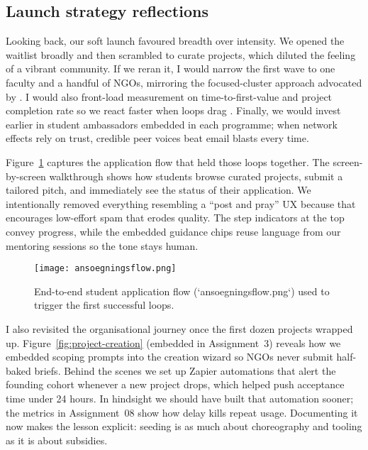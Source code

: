\subsection*{Launch strategy reflections}
Looking back, our soft launch favoured breadth over intensity. We opened the waitlist broadly and then scrambled to curate projects, which diluted the feeling of a vibrant community. If we reran it, I would narrow the first wave to one faculty and a handful of NGOs, mirroring the focused-cluster approach advocated by \citet{Choudary2016}. I would also front-load measurement on time-to-first-value and project completion rate so we react faster when loops drag \citep{ShapiroVarian1999}. Finally, we would invest earlier in student ambassadors embedded in each programme; when network effects rely on trust, credible peer voices beat email blasts every time.

Figure~\ref{fig:application-flow} captures the application flow that held those loops together. The screen-by-screen walkthrough shows how students browse curated projects, submit a tailored pitch, and immediately see the status of their application. We intentionally removed everything resembling a ``post and pray'' UX because that encourages low-effort spam that erodes quality. The step indicators at the top convey progress, while the embedded guidance chips reuse language from our mentoring sessions so the tone stays human.

\begin{figure}[h]
  \centering
  \texttt{[image: ansoegningsflow.png]}
  \caption{End-to-end student application flow (`ansoegningsflow.png`) used to trigger the first successful loops.}
  \label{fig:application-flow}
\end{figure}

I also revisited the organisational journey once the first dozen projects wrapped up. Figure~\ref{fig:project-creation} (embedded in Assignment~3) reveals how we embedded scoping prompts into the creation wizard so NGOs never submit half-baked briefs. Behind the scenes we set up Zapier automations that alert the founding cohort whenever a new project drops, which helped push acceptance time under 24 hours. In hindsight we should have built that automation sooner; the metrics in Assignment~08 show how delay kills repeat usage. Documenting it now makes the lesson explicit: seeding is as much about choreography and tooling as it is about subsidies.
